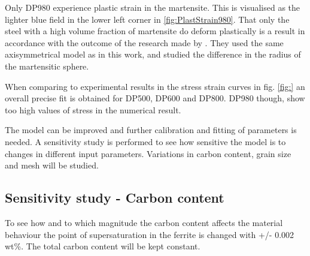 \documentclass{article}
\begin{document}
Only DP980 experience plastic strain in the martensite. This is visualised as the lighter blue field in the lower left corner in \ref{fig:PlastStrain980}. That only the steel with a high volume fraction of martensite do deform plastically is a result in accordance with the outcome of the research made by \cite{Al-Abbasi2003}. They used the same axisymmetrical model as in this work, and studied the difference in the radius of the martensitic sphere. 

When comparing to experimental results in the stress strain curves in fig. \ref{fig:} an overall precise fit is obtained for DP500, DP600 and DP800. DP980 though, show too high values of stress in the numerical result. 

The model can be improved and further calibration and fitting of parameters is needed. A sensitivity study is performed to see how sensitive the model is to changes in different input parameters. Variations in carbon content, grain size and mesh will be studied. 
 

\subsection{Sensitivity study - Carbon content}
\label{SensStudyCarbon}

To see how and to which magnitude the carbon content affects the material behaviour the point of supersaturation in the ferrite is changed with +/- 0.002 wt\%. The total carbon content will be kept constant.  
\end{document}
